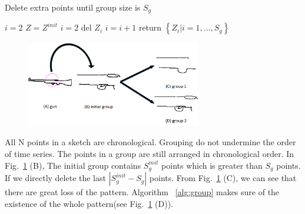 \begin{algorithm}[h]
\label{alg:group}
    \caption{Delete extra points until group size is $S_g$}
    $i = 2$\;
    $Z = Z^{init}$\;
    {
        {
            $i = 2$\;
        }
        del $Z_i$\;
        $i = i+1$\;
    }
    return $\left\{ Z_i| i = 1, ..., S_g \right\}$\;
\end{algorithm}

\begin{figure}
    \center
    \includegraphics[width=3in]{images/group.png}
    \label{fig:group}
\end{figure}

All N points in a sketch are chronological. Grouping do not undermine the order of time series. The points in a group are still arranged in chronological order. In Fig.~\ref{fig:group} (B), The initial group contains $S_g^{init}$ points which is greater than $S_g$ points. If we directly delete the last $|S_g^{init}-S_g|$ points. From Fig.~\ref{fig:group} (C), we can see that there are great loss of the pattern.  Algorithm ~\ref{alg:group} makes sure of the existence of the whole pattern(see Fig.~\ref{fig:group} (D)).


